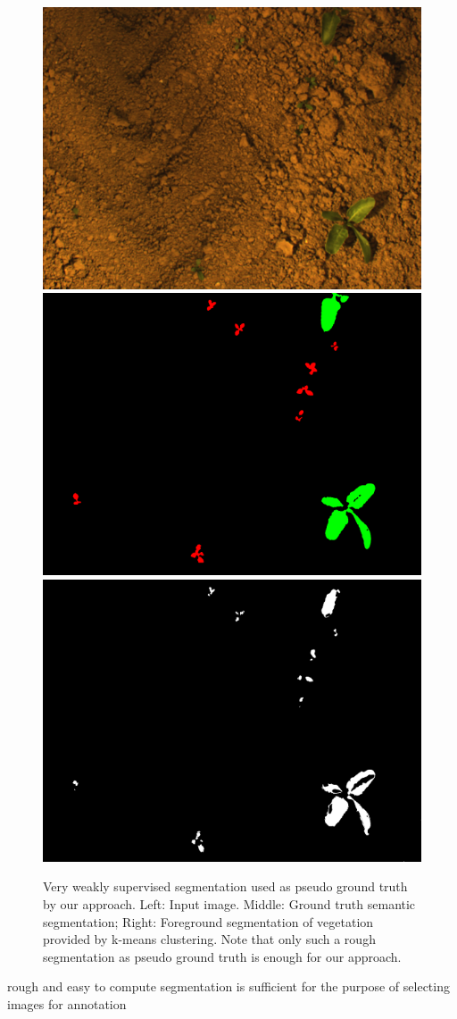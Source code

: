 \documentclass[letterpaper, 10 pt, conference]{ieeeconf}  %
\begin{document}
\begin{figure}
    \centering
    \includegraphics[width=0.32\linewidth]{pics/unsupervised/img_masks_8mm_fromImages_frame256.png}
    \includegraphics[width=0.32\linewidth]{pics/unsupervised/gt_masks_8mm_fromImages_frame256_GroundTruth_iMap.png}
    \includegraphics[width=0.32\linewidth]{pics/unsupervised/lbl_masks_8mm_fromImages_frame256.png}
    \caption{Very weakly supervised segmentation used as pseudo ground
      truth by our approach.  Left: Input image. Middle: Ground truth semantic
      segmentation; Right: Foreground segmentation of vegetation
      provided by k-means clustering. Note that only such a rough
      segmentation as pseudo ground truth is enough for our approach.}
    \label{fig:unsupervised_foreground}
\end{figure}


rough and easy to compute segmentation is sufficient for the purpose of selecting images for annotation
\end{document}
